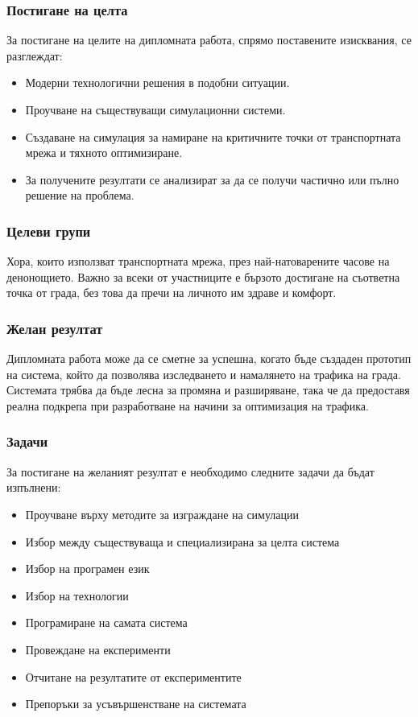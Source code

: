 	\subsubsection{Постигане на целта}

		За постигане на целите на дипломната работа, спрямо поставените изисквания, се разглеждат:
		\begin{itemize}
			\item Модерни технологични решения в подобни ситуации.
			\item Проучване на съществуващи симулационни системи.
			\item Създаване на симулация за намиране на критичните точки от транспортната мрежа и тяхното оптимизиране.
			\item За получените резултати се анализират за да се получи частично или пълно решение на проблема.
		\end{itemize}

	\subsubsection{Целеви групи}
	
		Хора, които използват транспортната мрежа, през най-натоварените часове на денонощието. Важно за всеки от участниците е бързото достигане на съответна точка от града, без това да пречи на личното им здраве и комфорт.
	
	\subsubsection{Желан резултат}
	
		Дипломната работа може да се сметне за успешна, когато бъде създаден прототип на система, който да позволява 
		изследването и намалянето на трафика на града. Системата трябва да бъде лесна за промяна и разширяване,
		така че да предоставя реална подкрепа при разработване на начини за оптимизация на трафика.
		
	
	\subsubsection{Задачи}
		
		За постигане на желаният резултат е необходимо следните задачи да бъдат изпълнени:	
	
		\begin{itemize}
			\item Проучване върху методите за изграждане на симулации
			\item Избор между съществуваща и специализирана за целта система
			\item Избор на програмен език
			\item Избор на технологии
			\item Програмиране на самата система
			\item Провеждане на експерименти
			\item Отчитане на резултатите от експериментите
			\item Препоръки за усъвършенстване на системата
		\end{itemize}